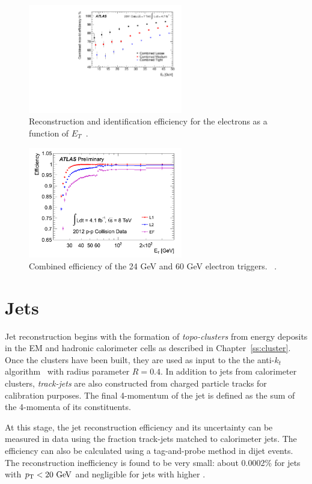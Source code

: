\begin{figure}[hp]
\centering
\includegraphics[width=0.6\textwidth]{fig/obj/electronID.pdf}
\caption{Reconstruction and identification efficiency for the electrons as a function of $E_{T}$~\cite{Aad:2014fxa}.}
\label{fig:electronID}
\end{figure}
\begin{figure}[hp]
\centering
\includegraphics[width=0.6\textwidth]{fig/obj/eltrigger.png}
\caption{Combined efficiency of the 24 GeV and 60 GeV electron triggers. ~\cite{eltrig}.}
\label{fig:eltrigger}
\end{figure}

\section{Jets}
Jet reconstruction begins with the formation of \emph{topo-clusters} from energy deposits in the EM and hadronic calorimeter cells as described in Chapter~\ref{ss:cluster}. Once the clusters have been built, they are used as input to the the anti-$k_t$ algorithm~\cite{antikt1,antikt2,antikt3} with radius parameter $R=0.4$. In addition to jets from calorimeter clusters, \emph{track-jets} are also constructed from charged particle tracks for calibration purposes. The final 4-momentum of the jet is defined as the sum of the 4-momenta of its constituents. 

At this stage, the jet reconstruction efficiency and its uncertainty can be measured in data using the fraction track-jets matched to calorimeter jets. The efficiency can also be calculated using a tag-and-probe method in dijet events. The reconstruction inefficiency is found to be very small: about 0.0002\% for jets with $\pt< 20 \gev$ and negligible for jets with higher \pt.

